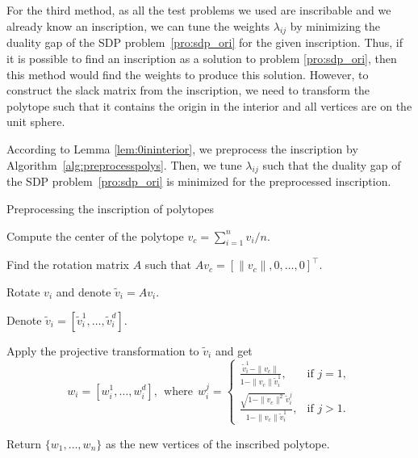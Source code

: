\documentclass[smallextended, envcountsame]{svjour3}
\begin{document}
    For the third method, as all the test problems we used are inscribable and we already know an inscription, we can tune the weights $\lambda_{ij}$ by minimizing the duality gap of the SDP problem~\eqref{pro:sdp_ori} for the given inscription.  Thus, if it is possible to find an inscription as a solution to problem \eqref{pro:sdp_ori}, then this method would find the weights to produce this solution.  However, to construct the slack matrix from the inscription, we need to transform the polytope such that it contains the origin in the interior and all vertices are on the unit sphere. 
    
    According to Lemma \ref{lem:0ininterior}, we preprocess the inscription by Algorithm~\ref{alg:preprocesspolys}.  Then, we tune $\lambda_{ij}$ such that the duality gap of the SDP problem~\eqref{pro:sdp_ori} is minimized for the preprocessed inscription.
    \begin{algorithm}[!htb]\caption{Preprocessing the inscription of polytopes}\label{alg:preprocesspolys}
    \DontPrintSemicolon
        Compute the center of the polytope $v_c=\sum\limits_{i=1}^n v_i\slash n$.

        Find the rotation matrix $A$ such that $Av_c=[\|v_c\|,0,\ldots,0]^\top$.

        {
            Rotate $v_i$ and denote $\widetilde{v}_i=Av_i$.
            
            Denote $\widetilde{v}_i=[\widetilde{v}_i^1,\ldots,\widetilde{v}_i^d]$.

            Apply the projective transformation to $\widetilde{v}_i$ and get
            \begin{equation*}
                w_i=\left[w_i^1,\ldots,w_i^d\right],~~\text{where}~~
                w_i^j=\begin{cases}
                    \frac{\widetilde{v}_i^1-\|v_c\|}{1-\|v_c\|\widetilde{v}_i^1}, &\text{if $j=1$},\\
                    \frac{\sqrt{1-\|v_c\|^2}\widetilde{v}_i^j}{1-\|v_c\|\widetilde{v}_i^1}, &\text{if $j>1$}.
                \end{cases}
            \end{equation*}

            Return $\{w_1,\ldots,w_n\}$ as the new vertices of the inscribed polytope.
        }
    \end{algorithm}\FloatBarrier
\end{document}
